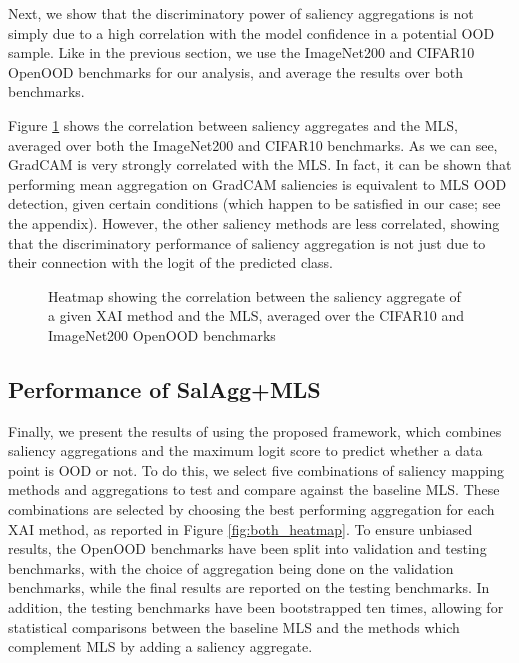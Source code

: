 \documentclass[runningheads]{llncs}
\begin{document}
Next, we show that the discriminatory power of saliency aggregations is not simply due to a high correlation with the model confidence in a potential OOD sample. Like in the previous section, we use the ImageNet200 and CIFAR10 OpenOOD benchmarks for our analysis, and average the results over both benchmarks.

Figure \ref{fig:corr} shows the correlation between saliency aggregates and the MLS, averaged over both the ImageNet200 and CIFAR10 benchmarks. As we can see, GradCAM is very strongly correlated with the MLS. In fact, it can be shown that performing mean aggregation on GradCAM saliencies is equivalent to MLS OOD detection, given certain conditions (which happen to be satisfied in our case; see the appendix). However, the other saliency methods are less correlated, showing that the discriminatory performance of saliency aggregation is not just due to their connection with the logit of the predicted class.

\begin{figure}[hbtp]
    \begin{center}
    \resizebox{0.8\textwidth}{!}{%
        
    }
    \end{center}
    \caption[Average Correlation on ImageNet200 and CIFAR10]{Heatmap showing the correlation between the saliency aggregate of a given XAI method and the MLS, averaged over the CIFAR10 and ImageNet200 OpenOOD benchmarks}
    \label{fig:corr}
\end{figure}

\subsection{Performance of SalAgg+MLS}

Finally, we present the results of using the proposed framework, which combines saliency aggregations and the maximum logit score to predict whether a data point is OOD or not. To do this, we select five combinations of saliency mapping methods and aggregations to test and compare against the baseline MLS. These combinations are selected by choosing the best performing aggregation for each XAI method, as reported in Figure \ref{fig:both_heatmap}. To ensure unbiased results, the OpenOOD benchmarks have been split into validation and testing benchmarks, with the choice of aggregation being done on the validation benchmarks, while the final results are reported on the testing benchmarks. In addition, the testing benchmarks have been bootstrapped ten times, allowing for statistical comparisons between the baseline MLS and the methods which complement MLS by adding a saliency aggregate.
\end{document}
